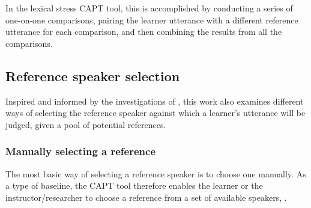 	In the lexical stress CAPT tool, this is accomplished by conducting a series of one-on-one comparisons, pairing the learner utterance with a different reference utterance for each comparison, and then combining the results from all the comparisons. 
	
	

	\subsection{Reference speaker selection}
	\label{sec:compare:selection}	
	
	Inspired and informed by the investigations of \textcite{Probst2002}, this work also examines different ways of selecting the reference speaker against which a learner's utterance will be judged, given a pool of potential references. 
	
	
		\subsubsection{Manually selecting a reference}
		\label{sec:selection:manual}
		
		The most basic way of selecting a reference speaker is to choose one manually.
As a type of baseline, the CAPT tool therefore enables the learner or the instructor/researcher to choose a reference from a set of available speakers, . 



